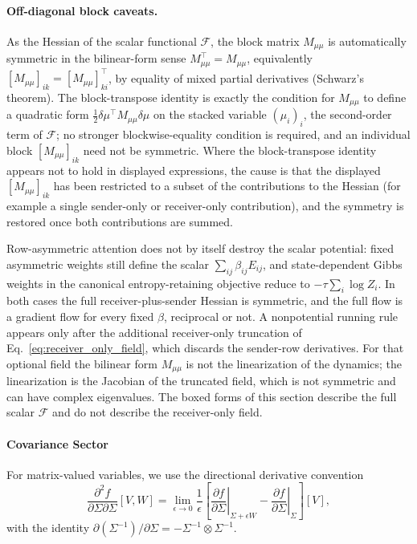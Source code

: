 \documentclass[11pt]{article}
\begin{document}
\paragraph{Off-diagonal block caveats.}\label{sec:mass_block_caveats}
As the Hessian of the scalar functional $\mathcal{F}$, the block matrix $M_{\mu\mu}$ is automatically symmetric in the bilinear-form sense $M_{\mu\mu}^\top = M_{\mu\mu}$, equivalently $[M_{\mu\mu}]_{ik} = [M_{\mu\mu}]_{ki}^\top$, by equality of mixed partial derivatives (Schwarz's theorem). The block-transpose identity is exactly the condition for $M_{\mu\mu}$ to define a quadratic form $\tfrac12 \delta\mu^\top M_{\mu\mu} \delta\mu$ on the stacked variable $(\mu_i)_i$, the second-order term of $\mathcal{F}$; no stronger blockwise-equality condition is required, and an individual block $[M_{\mu\mu}]_{ik}$ need not be symmetric. Where the block-transpose identity appears not to hold in displayed expressions, the cause is that the displayed $[M_{\mu\mu}]_{ik}$ has been restricted to a subset of the contributions to the Hessian (for example a single sender-only or receiver-only contribution), and the symmetry is restored once both contributions are summed.

Row-asymmetric attention does not by itself destroy the scalar potential: fixed asymmetric weights still define the scalar $\sum_{ij}\beta_{ij}E_{ij}$, and state-dependent Gibbs weights in the canonical entropy-retaining objective reduce to $-\tau\sum_i\log Z_i$. In both cases the full receiver-plus-sender Hessian is symmetric, and the full flow is a gradient flow for every fixed $\beta$, reciprocal or not. A nonpotential running rule appears only after the additional receiver-only truncation of Eq.~\eqref{eq:receiver_only_field}, which discards the sender-row derivatives. For that optional field the bilinear form $M_{\mu\mu}$ is not the linearization of the dynamics; the linearization is the Jacobian of the truncated field, which is not symmetric and can have complex eigenvalues. The boxed forms of this section describe the full scalar $\mathcal{F}$ and do not describe the receiver-only field.

\paragraph{Covariance Sector}

For matrix-valued variables, we use the directional derivative convention
\begin{equation}
\frac{\partial^2 f}{\partial \Sigma \partial \Sigma}[V, W] = \lim_{\epsilon \to 0} \frac{1}{\epsilon}\left[\left.\frac{\partial f}{\partial \Sigma}\right|_{\Sigma + \epsilon W} - \left.\frac{\partial f}{\partial \Sigma}\right|_{\Sigma}\right][V],
\end{equation}
with the identity $\partial(\Sigma^{-1})/\partial \Sigma = -\Sigma^{-1} \otimes \Sigma^{-1}$.
\end{document}

